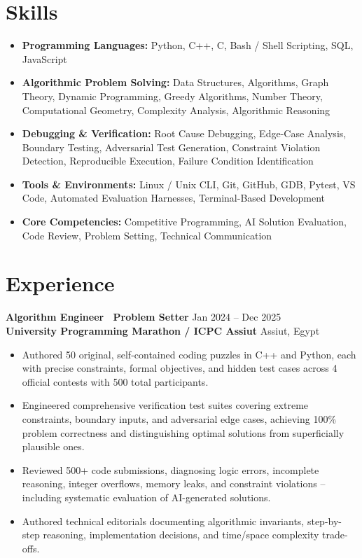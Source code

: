 \documentclass[letterpaper,10pt]{article}
\begin{document}
\section{Skills}

\begin{itemize}
  \item \textbf{Programming Languages:} Python, C++, C, Bash / Shell Scripting, SQL, JavaScript
  \item \textbf{Algorithmic Problem Solving:} Data Structures, Algorithms, Graph Theory, Dynamic Programming, Greedy Algorithms, Number Theory, Computational Geometry, Complexity Analysis, Algorithmic Reasoning
  \item \textbf{Debugging \& Verification:} Root Cause Debugging, Edge-Case Analysis, Boundary Testing, Adversarial Test Generation, Constraint Violation Detection, Reproducible Execution, Failure Condition Identification
  \item \textbf{Tools \& Environments:} Linux / Unix CLI, Git, GitHub, GDB, Pytest, VS Code, Automated Evaluation Harnesses, Terminal-Based Development
  \item \textbf{Core Competencies:} Competitive Programming, AI Solution Evaluation, Code Review, Problem Setting, Technical Communication
\end{itemize}

\section{Experience}

\textbf{Algorithm Engineer \textbar\ Problem Setter} \hfill Jan 2024 -- Dec 2025\\
\textbf{University Programming Marathon / ICPC Assiut} \hfill Assiut, Egypt
\begin{itemize}
  \item Authored 50 original, self-contained coding puzzles in C++ and Python, each with precise constraints, formal objectives, and hidden test cases across 4 official contests with 500 total participants.
  \item Engineered comprehensive verification test suites covering extreme constraints, boundary inputs, and adversarial edge cases, achieving 100\% problem correctness and distinguishing optimal solutions from superficially plausible ones.
  \item Reviewed 500+ code submissions, diagnosing logic errors, incomplete reasoning, integer overflows, memory leaks, and constraint violations -- including systematic evaluation of AI-generated solutions.
  \item Authored technical editorials documenting algorithmic invariants, step-by-step reasoning, implementation decisions, and time/space complexity trade-offs.
\end{itemize}
\end{document}
